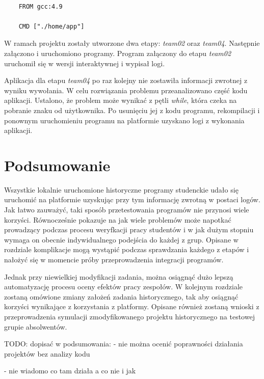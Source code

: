 {\selectfont
\tiny
\begin{lstlisting}

    FROM gcc:4.9

    CMD ["./home/app"]

\end{lstlisting}
}

W ramach projektu zostały utworzone dwa etapy:  \textit{team02} oraz \textit{team04}.
Następnie załączono i uruchomiono programy.
Program załączony do etapu \textit{team02} uruchomił się w wersji interaktywnej i wypisał logi.

Aplikacja dla etapu \textit{team04} po raz kolejny nie zostawiła informacji zwrotnej z wyniku wywołania.
W celu rozwiązania problemu przeanalizowano część kodu aplikacji.
Ustalono, że problem może wynikać z pętli \textit{while}, która czeka na pobranie znaku od użytkownika.
Po usunięciu jej z kodu programu, rekompilacji i ponownym uruchomieniu programu na platformie uzyskano logi z wykonania aplikacji.


\section{Podsumowanie}
\label{verification_summary}

Wszystkie lokalnie uruchomione  historyczne programy  studenckie udało się uruchomić na platformie uzyskując przy tym informację zwrotną w postaci logów.
Jak łatwo zauważyć, taki sposób przetestowania programów nie przynosi wiele korzyści.
Równocześnie pokazuje na jak wiele problemów może napotkać prowadzący podczas procesu weryfkacji pracy studentów i w jak dużym stopniu wymaga on obecnie indywidualnego podejścia do każdej z grup.
Opisane w rozdziale komplikacje mogą wystąpić podczas sprawdzania każdego z etapów i nałożyć się w momencie próby przeprowadzenia integracji programów.

Jednak przy niewielkiej modyfikacji zadania, można osiągnąć dużo lepszą automatyzację procesu oceny efektów pracy zespołów.
W kolejnym rozdziale zostaną omówione zmiany założeń zadania historycznego, tak aby osiągnąć korzyści wynikające z korzystania z platformy.
Opisane również zostaną wnioski z przeprowadzenia symulacji zmodyfikowanego projektu historycznego na testowej grupie absolwentów.

TODO: dopisać w podsumowania:
- nie można ocenić poprawności działania projektów bez analizy kodu

- nie wiadomo co tam działa a co nie i jak

